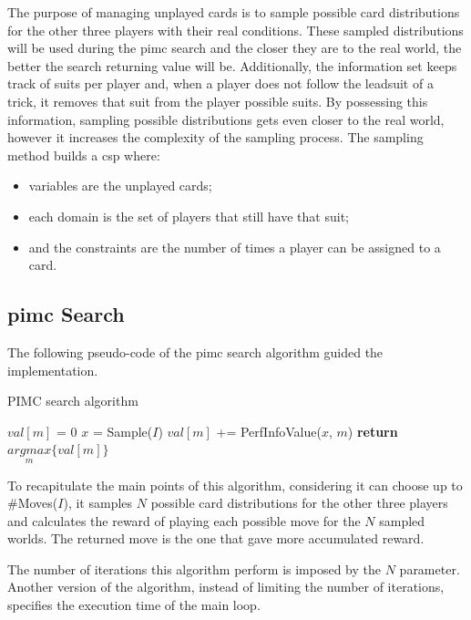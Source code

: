 The purpose of managing unplayed cards is to sample possible card distributions for the other three players with their real conditions.
These sampled distributions will be used during the \ac{pimc} search and the closer they are to the real world, the better the search returning value will be.
Additionally, the information set keeps track of suits per player and, when a player does not follow the leadsuit of a trick, it removes that suit from the player possible suits.
By possessing this information, sampling possible distributions gets even closer to the real world, however it increases the complexity of the sampling process.
The sampling method builds a \ac{csp} where:
\begin{itemize}
\item variables are the unplayed cards;
\item each domain is the set of players that still have that suit;
\item and the constraints are the number of times a player can be assigned to a card.
\end{itemize}


\subsection{\ac{pimc} Search}
The following pseudo-code of the \ac{pimc} search algorithm guided the implementation.

\begin{algorithm}
	\caption{PIMC search algorithm}
	\begin{algorithmic}[1]
				\State $val[m]$ = 0
			\EndFor
				\State $x$ = Sample($I$)
					\State $val[m]$ += PerfInfoValue($x$, $m$)
				\EndFor
			\EndFor
			\State \textbf{return} $\underset{m}{argmax}\{ val[m] \}$
		\EndProcedure
		\label{alg:pimc}
	\end{algorithmic}
\end{algorithm}

To recapitulate the main points of this algorithm, considering it can choose up to \#Moves($I$), it samples $N$ possible card distributions for the other three players and calculates the reward of playing each possible move for the $N$ sampled worlds.
The returned move is the one that gave more accumulated reward.

The number of iterations this algorithm perform is imposed by the $N$ parameter.
Another version of the algorithm, instead of limiting the number of iterations, specifies the execution time of the main loop.


